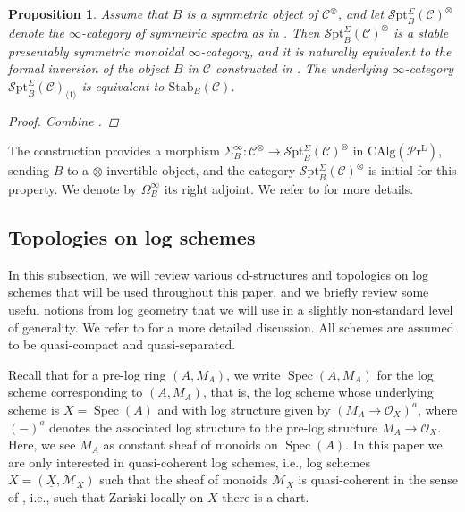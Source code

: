 \documentclass[11pt, a4paper]{amsart}
\newtheorem{prop}[thm]{Proposition}
\theoremstyle{definition}
\numberwithin{equation}{subsection}
\providecommand{\Spec}[1]{\operatorname{Spec}(#1)} 	%
\newcommand{\Stab}{\mathrm{Stab}}
\newcommand{\infSpt}{\mathcal{S}\mathrm{pt}}
\newcommand{\LPr}{\mathcal{P}\mathrm{r}^{\mathrm{L}}}
\newcommand{\CAlg}{\mathrm{CAlg}}
\newcommand{\infC}{\mathcal{C}}
\begin{document}
\begin{prop}\label{prop:def-spt}\label{alter.1} Assume that $B$ is a symmetric object of $\infC^\otimes$, and let $\infSpt_B^\Sigma(\infC)^\otimes$ denote the $\infty$-category of \emph{symmetric spectra} as in \cite[Section 2.3]{RobaloThesispublished}.
    Then $\infSpt_B^\Sigma(\infC)^\otimes$ is a  stable presentably symmetric monoidal $\infty$-category, and it is naturally equivalent to the formal inversion  of the object $B$ in $\infC$ constructed in \cite[Proposition 2.9]{RobaloThesispublished}. The underlying $\infty$-category $\infSpt_B^\Sigma(\infC)_{\langle 1 \rangle}$ is equivalent to $\Stab_B(\infC)$. 
    \begin{proof}
Combine \cite[Corollary 2.22, Theorem 2.26]{RobaloThesispublished}.
    \end{proof}
\end{prop}
The construction provides a morphism $\Sigma^\infty_B\colon \infC^\otimes \to \infSpt_B^\Sigma(\infC)^\otimes$ in $\CAlg(\LPr)$, sending $B$ to a $\otimes$-invertible object, and the category $\infSpt_B^\Sigma(\infC)^\otimes$ is initial for this property. We denote by $\Omega^\infty_B$ its right adjoint. 
We refer to \cite{RobaloThesispublished} for more details.\index[notation]{infSptB @ $\infSpt_B^\Sigma$}








\subsection{Topologies on log schemes}\label{ssec:topologies}
In this subsection, 
we will review various cd-structures and topologies on  log schemes that will be used throughout this paper, and we briefly review some useful notions from log geometry that we will use in a slightly non-standard level of generality. We refer to \cite[Appendix A]{Koshikawa} for a more detailed discussion. All schemes are assumed to be quasi-compact and quasi-separated.  

Recall that for a pre-log ring $(A,M_A)$, we write $\Spec{A,M_A}$ for the log scheme corresponding to $(A,M_A)$, that is, the log scheme whose underlying scheme is $X=\Spec{A}$ and with log structure given by $(M_A\to \mathcal{O}_X)^a$, where $(-)^a$ denotes the associated log structure to the pre-log structure $M_A\to \mathcal{O}_X$. Here, we see $M_A$ as constant sheaf of monoids on $\Spec{A}$.  In this paper we are only interested in quasi-coherent log schemes, i.e., log schemes $X=(\underline{X},\mathcal{M}_X)$ such that the sheaf of monoids $\mathcal{M}_X$ is quasi-coherent in the sense of \cite[Definition II.2.1.5]{Ogu}, i.e., such that Zariski locally on $X$ there is a chart. 
\end{document}
